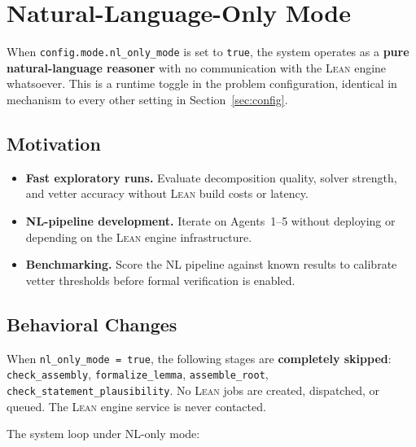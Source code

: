 \documentclass[11pt,a4paper]{article}
\newcommand{\Lean}{\textsc{Lean}}
\begin{document}
\section{Natural-Language-Only Mode}
\label{sec:nl_only_mode}

When \texttt{config.mode.nl\_only\_mode} is set to \texttt{true}, the system operates as a \textbf{pure natural-language reasoner} with no communication with the \Lean{} engine whatsoever. This is a runtime toggle in the problem configuration, identical in mechanism to every other setting in Section~\ref{sec:config}.

\subsection{Motivation}
\begin{itemize}[leftmargin=2em]
  \item \textbf{Fast exploratory runs.} Evaluate decomposition quality, solver strength, and vetter accuracy without \Lean{} build costs or latency.
  \item \textbf{NL-pipeline development.} Iterate on Agents~1--5 without deploying or depending on the \Lean{} engine infrastructure.
  \item \textbf{Benchmarking.} Score the NL pipeline against known results to calibrate vetter thresholds before formal verification is enabled.
\end{itemize}

\subsection{Behavioral Changes}

\begin{policybox}
When \texttt{nl\_only\_mode = true}, the following stages are \textbf{completely skipped}: \texttt{check\_assembly}, \texttt{formalize\_lemma}, \texttt{assemble\_root}, \texttt{check\_statement\_plausibility}. No \Lean{} jobs are created, dispatched, or queued. The \Lean{} engine service is never contacted.
\end{policybox}

The system loop under NL-only mode:
\end{document}
